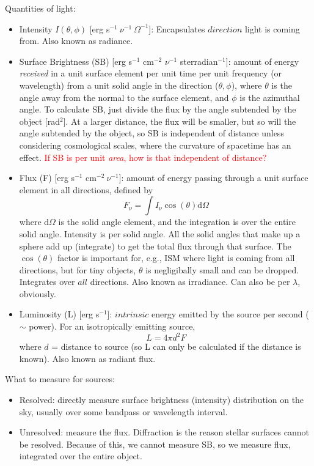 \documentclass[12pt]{article}
\begin{document}
Quantities of light:
\begin{itemize}
    \item Intensity $I(\theta,\phi)$ [erg s$^{-1}\ \nu^{-1}\ \Omega^{-1}$]:
        Encapsulates $direction$ light is coming from.
        Also known as radiance.
    \item Surface Brightness (SB)
        [erg s$^{-1}$ cm$^{-2}$ $\nu^{-1}$ sterradian$^{-1}$]:
        amount of energy \emph{received} in a unit surface
        element per unit time per unit frequency (or wavelength)
        from a unit
        solid angle in the direction ($\theta,\phi$), where $\theta$
        is the angle
        away from the normal to the surface element, and $\phi$ is the
        azimuthal angle.
        To calculate SB, just divide the flux by the angle subtended
        by the object [rad$^2$]. At a larger distance, the flux will
        be smaller, but so will the angle subtended by the object, so
        SB is independent of distance unless considering cosmological
        scales, where the curvature of spacetime has an effect.
        \textcolor{red}{If SB is per unit \emph{area}, how is that
        independent of distance?}
    \item Flux (F) [erg s$^{-1}$ cm$^{-2}\ \nu^{-1}$]:
        amount of energy passing through a unit surface element
        in all directions, defined by
        \begin{equation}
            F_{\nu} = \int I_{\nu}\cos(\theta)\textrm{d}\Omega
        \end{equation}
        where d$\Omega$ is the solid angle element, and the integration is
        over the entire solid angle. Intensity is per solid angle. All
        the solid angles that make up a sphere add up (integrate) to
        get the total flux through that surface.
        The $\cos(\theta)$ factor is important
        for, e.g., ISM where light is coming from all directions, but for
        tiny objects, $\theta$ is negligibally small and can be dropped.
        Integrates over $all$ directions.
        Also known as irradiance. Can also be per $\lambda$, obviously.
    \item Luminosity (L) [erg s$^{-1}$]:
        $intrinsic$ energy emitted by the source per
        second ($\sim$ power). For an isotropically emitting source,
        \begin{equation}
            L = 4 \pi d^2 F
        \end{equation}
        where $d$ = distance to source (so L can only be calculated if
        the distance is known). Also known as radiant flux.
\end{itemize}
What to measure for sources:
\begin{itemize}
    \item Resolved: directly measure surface brightness (intensity)
        distribution on the sky, usually over some bandpass or wavelength
        interval.
    \item Unresolved: measure the flux. Diffraction is the reason stellar
        surfaces cannot be resolved. Because of this, we cannot measure
        SB, so we measure flux, integrated over the entire object.
\end{itemize}
\end{document}
